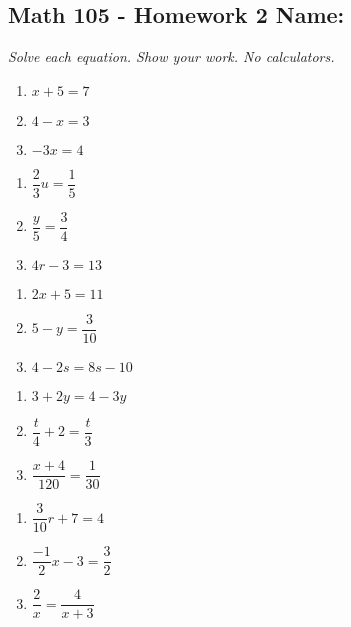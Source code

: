 \documentclass[11pt]{article}
\begin{document}
\pagestyle{empty}
\subsection*{Math 105 - Homework 2 \hfill Name: \underline{\hspace*{2in}}}
\textit{Solve each equation. Show your work. No calculators.} 

\begin{multicols}{3}
\begin{enumerate}
\item $x+5 = 7$
\item $4 - x = 3$
\item $-3x = 4$
\setcounter{enumCount}{\theenumi}
\end{enumerate}
\end{multicols}
\vfill

\begin{multicols}{3}
\begin{enumerate}
\setcounter{enumi}{\theenumCount}
\item $\dfrac{2}{3}u = \dfrac{1}{5}$
\item $\dfrac{y}{5} = \dfrac{3}{4}$
\item $4r - 3 = 13$
\setcounter{enumCount}{\theenumi}
\end{enumerate}
\end{multicols}
\vfill

\begin{multicols}{3}
\begin{enumerate}
\setcounter{enumi}{\theenumCount}
\item $2x + 5 = 11$
\item $5-y = \dfrac{3}{10}$
\item $4 - 2s =  8s - 10$
\setcounter{enumCount}{\theenumi}
\end{enumerate}
\end{multicols}
\vfill

\begin{multicols}{3}
\begin{enumerate}
\setcounter{enumi}{\theenumCount}
\item $3 + 2y = 4 - 3y$
\item $\dfrac{t}{4} + 2 = \dfrac{t}{3}$
\item $\dfrac{x+4}{120} = \dfrac{1}{30}$
\setcounter{enumCount}{\theenumi}
\end{enumerate}
\end{multicols}
\vfill


\begin{multicols}{3}
\begin{enumerate}
\setcounter{enumi}{\theenumCount}
\item $\dfrac{3}{10}r + 7= 4$
\item $\dfrac{-1}{2}x - 3 = \dfrac{3}{2}$
\item $\dfrac{2}{x} = \dfrac{4}{x+3}$
\setcounter{enumCount}{\theenumi}
\end{enumerate}
\end{multicols}
\vfill
\end{document}
